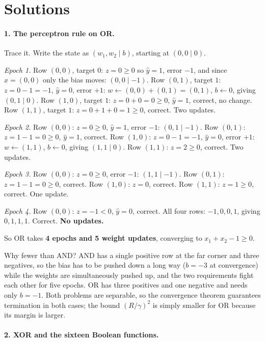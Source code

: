 \documentclass[11pt]{article}
\begin{document}
\section{Solutions}
\label{sec:solutions}

\paragraph{1. The perceptron rule on OR.}
Trace it. Write the state as $(w_1, w_2 \mid b)$, starting at
$(0,0 \mid 0)$.

\emph{Epoch 1.} Row $(0,0)$, target $0$: $z = 0 \ge 0$ so $\hat y = 1$,
error $-1$, and since $x = (0,0)$ only the bias moves:
$(0,0 \mid -1)$. Row $(0,1)$, target $1$: $z = 0 - 1 = -1$, $\hat y = 0$,
error $+1$: $w \leftarrow (0,0)+(0,1) = (0,1)$, $b \leftarrow 0$, giving
$(0,1 \mid 0)$. Row $(1,0)$, target $1$: $z = 0 + 0 = 0 \ge 0$, $\hat y = 1$,
correct, no change. Row $(1,1)$, target $1$: $z = 0 + 1 + 0 = 1 \ge 0$,
correct. Two updates.

\emph{Epoch 2.} Row $(0,0)$: $z = 0 \ge 0$, $\hat y = 1$, error $-1$:
$(0,1 \mid -1)$. Row $(0,1)$: $z = 1 - 1 = 0 \ge 0$, $\hat y = 1$, correct.
Row $(1,0)$: $z = 0 - 1 = -1$, $\hat y = 0$, error $+1$:
$w \leftarrow (1,1)$, $b \leftarrow 0$, giving $(1,1 \mid 0)$. Row $(1,1)$:
$z = 2 \ge 0$, correct. Two updates.

\emph{Epoch 3.} Row $(0,0)$: $z = 0 \ge 0$, error $-1$: $(1,1 \mid -1)$.
Row $(0,1)$: $z = 1 - 1 = 0 \ge 0$, correct. Row $(1,0)$: $z = 0$, correct.
Row $(1,1)$: $z = 1 \ge 0$, correct. One update.

\emph{Epoch 4.} Row $(0,0)$: $z = -1 < 0$, $\hat y = 0$, correct. All four
rows: $-1, 0, 0, 1$, giving $0, 1, 1, 1$. Correct. \textbf{No updates.}

So OR takes \textbf{4 epochs and 5 weight updates}, converging to
$x_1 + x_2 - 1 \ge 0$.

Why fewer than AND? AND has a single positive row at the far corner and three
negatives, so the bias has to be pushed down a long way ($b = -3$ at
convergence) while the weights are simultaneously pushed up, and the two
requirements fight each other for five epochs. OR has three positives and one
negative and needs only $b = -1$. Both problems are separable, so the
convergence theorem guarantees termination in both cases; the bound
$(R/\gamma)^2$ is simply smaller for OR because its margin is larger.

\paragraph{2. XOR and the sixteen Boolean functions.}
\end{document}

